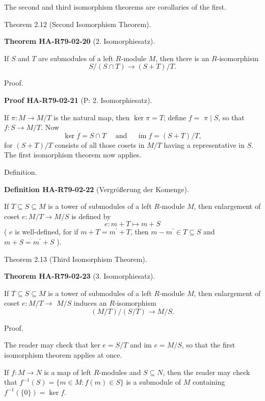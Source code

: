 \documentclass[10pt, letterpaper]{article}
\newcommand{\CustomHeading}[3]{%
  \par\medskip\noindent%
  \textbf{#1 #2} \textnormal{(#3)}.\enskip%
}
\newenvironment{DEF}[2]{\begin{unitbox}\CustomHeading{Definition}{#1}{#2}}{\end{unitbox}}
\newenvironment{THEO}[2]{\begin{unitbox}\CustomHeading{Theorem}{#1}{#2}}{\end{unitbox}}
\newenvironment{PROOF}[2]{\begin{unitbox}\CustomHeading{Proof}{#1}{#2}}{\end{unitbox}}
\begin{document}
The second and third isomorphism theorems are corollaries of the first.


Theorem 2.12 (Second Isomorphism Theorem). 


\begin{THEO}{HA-R79-02-20}{2. Isomorphiesatz}
If $S$ and $T$ are submodules of a left $R$-module $M$, then there is an $R$-isomorphism
$$
S /(S \cap T) \rightarrow(S+T) / T .
$$
\end{THEO}


Proof. 


\begin{PROOF}{HA-R79-02-21}{P: 2. Isomorphiesatz}
If $\pi: M \rightarrow M / T$ is the natural map, then $\operatorname{ker} \pi=T$; define $f=$ $\pi \mid S$, so that $f: S \rightarrow M / T$. Now
$$
\operatorname{ker} f=S \cap T \quad \text { and } \quad \operatorname{im} f=(S+T) / T,
$$
for $(S+T) / T$ consists of all those cosets in $M / T$ having a representative in $S$. The first isomorphism theorem now applies.
\end{PROOF}



Definition. 



\begin{DEF}{HA-R79-02-22}{Vergrößerung der Komenge}
If $T \subseteq S \subseteq M$ is a tower of submodules of a left $R$-module $M$, then enlargement of coset $e: M / T \rightarrow M / S$ is defined by
$$
e: m+T \mapsto m+S
$$
( $e$ is well-defined, for if $m+T=m^{\prime}+T$, then $m-m^{\prime} \in T \subseteq S$ and $m+S=m^{\prime}+S$ ).
\end{DEF}



Theorem 2.13 (Third Isomorphism Theorem). 


\begin{THEO}{HA-R79-02-23}{3. Isomorphiesatz}
If $T \subseteq S \subseteq M$ is a tower of submodules of a left $R$-module $M$, then enlargement of coset $e: M / T \rightarrow$ $M / S$ induces an $R$-isomorphism
$$
(M / T) /(S / T) \rightarrow M / S .
$$
\end{THEO}


Proof. 

The reader may check that ker $e=S / T$ and im $e=M / S$, so that the first isomorphism theorem applies at once.

If $f: M \rightarrow N$ is a map of left $R$-modules and $S \subseteq N$, then the reader may check that $f^{-1}(S)=\{m \in M: f(m) \in S\}$ is a submodule of $M$ containing $f^{-1}(\{0\})=\operatorname{ker} f$.
\end{document}
